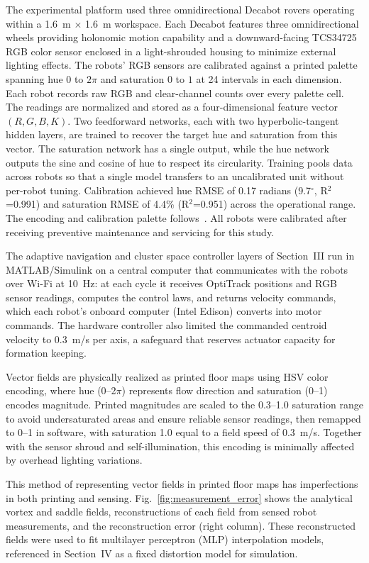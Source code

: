 \documentclass[lettersize,journal]{IEEEtran}
\begin{document}
The experimental platform used three omnidirectional Decabot rovers operating within a 1.6~m $\times$ 1.6~m workspace. Each Decabot features three omnidirectional wheels providing holonomic motion capability and a downward-facing TCS34725 RGB color sensor enclosed in a light-shrouded housing to minimize external lighting effects. The robots' RGB sensors are calibrated against a printed palette spanning hue $0$ to $2\pi$ and saturation $0$ to $1$ at 24 intervals in each dimension. Each robot records raw RGB and clear-channel counts over every palette cell. The readings are normalized and stored as a four-dimensional feature vector $(R,G,B,K)$. Two feedforward networks, each with two hyperbolic-tangent hidden layers, are trained to recover the target hue and saturation from this vector. The saturation network has a single output, while the hue network outputs the sine and cosine of hue to respect its circularity. Training pools data across robots so that a single model transfers to an uncalibrated unit without per-robot tuning. Calibration achieved hue RMSE of 0.17 radians (9.7$^\circ$, R$^2$=0.991) and saturation RMSE of 4.4\% (R$^2$=0.951) across the operational range. The encoding and calibration palette follows~\cite{22}. All robots were calibrated after receiving preventive maintenance and servicing for this study.

The adaptive navigation and cluster space controller layers of Section~III run in MATLAB/Simulink on a central computer that communicates with the robots over Wi-Fi at 10~Hz: at each cycle it receives OptiTrack positions and RGB sensor readings, computes the control laws, and returns velocity commands, which each robot's onboard computer (Intel Edison) converts into motor commands. The hardware controller also limited the commanded centroid velocity to 0.3~m/s per axis, a safeguard that reserves actuator capacity for formation keeping.

Vector fields are physically realized as printed floor maps using HSV color encoding, where hue (0--2$\pi$) represents flow direction and saturation (0--1) encodes magnitude. Printed magnitudes are scaled to the 0.3--1.0 saturation range to avoid undersaturated areas and ensure reliable sensor readings, then remapped to 0--1 in software, with saturation 1.0 equal to a field speed of 0.3~m/s. Together with the sensor shroud and self-illumination, this encoding is minimally affected by overhead lighting variations.

This method of representing vector fields in printed floor maps has imperfections in both printing and sensing. Fig.~\ref{fig:measurement_error} shows the analytical vortex and saddle fields, reconstructions of each field from sensed robot measurements, and the reconstruction error (right column). These reconstructed fields were used to fit multilayer perceptron (MLP) interpolation models, referenced in Section~IV as a fixed distortion model for simulation.
\end{document}
